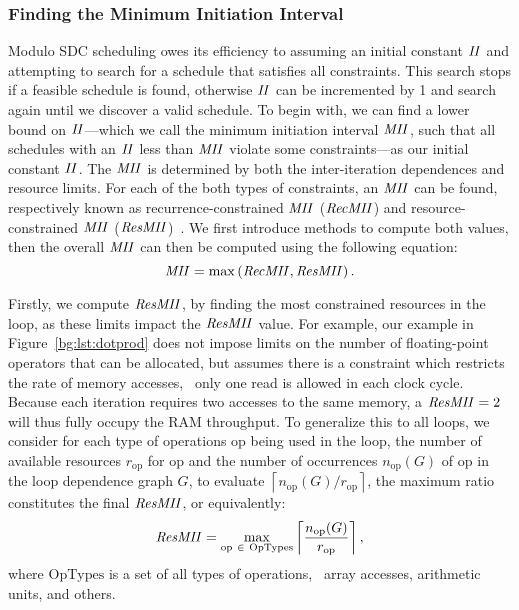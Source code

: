 \subsubsection{Finding the Minimum Initiation Interval}

Modulo SDC scheduling owes its efficiency to assuming an initial constant
$\mathit{II}$ and attempting to search for a schedule that satisfies all constraints.
This search stops if a feasible schedule is found, otherwise $\mathit{II}$ can be
incremented by 1 and search again until we discover a valid schedule.  To
begin with, we can find a lower bound on $\mathit{II}$---which we call the minimum
initiation interval $\mathit{MII}$, such that all schedules with an $\mathit{II}$ less than
$\mathit{MII}$ violate some constraints---as our initial constant $\mathit{II}$.  The $\mathit{MII}$ is
determined by both the inter-iteration dependences and resource limits.  For
each of the both types of constraints, an $\mathit{MII}$ can be found, respectively
known as recurrence-constrained $\mathit{MII}$ ($\mathit{RecMII}$) and resource-constrained
$\mathit{MII}$ ($\mathit{ResMII}$)~\cite{rau94, canis14, zhang13}.  We first introduce methods
to compute both values, then the overall $\mathit{MII}$ can then be computed using the
following equation:
\begin{equation}
    \mathit{MII} = \max\left(\mathit{RecMII}, \mathit{ResMII}\right).
\end{equation}

Firstly, we compute $\mathit{ResMII}$, by finding the most constrained resources
in the loop, as these limits impact the $\mathit{ResMII}$ value.  For example,
our example in Figure~\ref{bg:lst:dotprod} does not impose limits on the
number of floating-point operators that can be allocated, but assumes there
is a constraint which restricts the rate of memory accesses, \ie~only one
read is allowed in each clock cycle.  Because each iteration requires two
accesses to the same memory, a $\mathit{ResMII} = 2$ will thus fully occupy the RAM
throughput.  To generalize this to all loops, we consider for each type of
operations $\mathrm{op}$ being used in the loop, the number of available
resources $r_\mathrm{op}$ for $\mathrm{op}$ and the number of occurrences
$n_\mathrm{op}(G)$ of $\mathrm{op}$ in the loop dependence graph $G$, to
evaluate $\left\lceil n_\mathrm{op}(G) / r_\mathrm{op} \right\rceil$, the
maximum ratio constitutes the final $\mathit{ResMII}$, or equivalently:
\begin{equation}
    \mathit{ResMII} = \max_{\mathrm{op}~\in~\mathrm{OpTypes}}
        \left\lceil
            \frac{n_\mathrm{op}(G)}{r_\mathrm{op}}
        \right\rceil,
\end{equation}
where $\mathrm{OpTypes}$ is a set of all types of operations, \eg~array
accesses, arithmetic units, and others.

